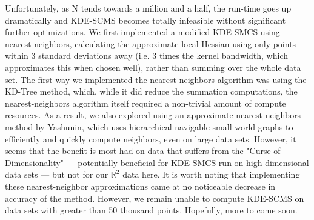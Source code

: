 \documentclass[letterpaper,fleqn]{article}
\theoremstyle{plain}
\theoremstyle{definition}
\newcommand{\1}{\mathds{1}}
\begin{document}
Unfortunately, as N tends towards a million and a half, the run-time goes up dramatically and KDE-SCMS becomes totally infeasible without significant further optimizations. We first implemented a modified KDE-SMCS using nearest-neighbors, calculating the approximate local Hessian using only points within 3 standard deviations away (i.e. 3 times the kernel bandwidth, which approximates this when chosen well), rather than summing over the whole data set. The first way we implemented the nearest-neighbors algorithm was using the KD-Tree method, which, while it did reduce the summation computations, the nearest-neighbors algorithm itself required a non-trivial amount of compute resources. As a result, we also explored using an approximate nearest-neighbors method by Yashunin\cite{hnsw}, which uses hierarchical navigable small world graphs to efficiently and quickly compute neighbors, even on large data sets. However, it seems that the benefit is most had on data that suffers from the "Curse of Dimensionality" — potentially beneficial for KDE-SMCS run on high-dimensional data sets — but not for our $\mathbb{R}^2$ data here. It is worth noting that implementing these nearest-neighbor approximations came at no noticeable decrease in accuracy of the method. However, we remain unable to compute KDE-SCMS on data sets with greater than 50 thousand points. Hopefully, more to come soon.

\newpage
\nocite{*}
\printbibliography
\end{document}
